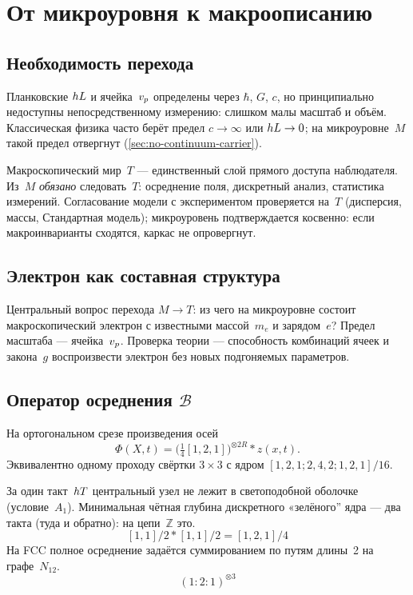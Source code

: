 \chapter{От микроуровня к макроописанию}
\label{ch:macro}

\section{Необходимость перехода}

Планковские $hL$ и ячейка~$v_p$ определены через $\hbar$, $G$, $c$,
но принципиально недоступны непосредственному измерению: слишком малы масштаб и объём.
Классическая физика часто берёт предел $c\to\infty$ или $hL\to 0$;
на микроуровне~$M$ такой предел отвергнут (\cref{sec:no-continuum-carrier}).

Макроскопический мир~$T$ --- единственный слой прямого доступа наблюдателя.
Из~$M$ \emph{обязано} следовать~$T$: осреднение поля, дискретный анализ, статистика измерений.
Согласование модели с экспериментом проверяется на~$T$ (дисперсия, массы, Стандартная модель);
микроуровень подтверждается косвенно: если макроинварианты сходятся,
каркас не опровергнут.

\section{Электрон как составная структура}

Центральный вопрос перехода $M\to T$: из чего на микроуровне состоит
макроскопический электрон с известными массой~$m_e$ и зарядом~$e$?
Предел масштаба --- ячейка~$v_p$.
Проверка теории --- способность комбинаций ячеек и закона~$g$
воспроизвести электрон без новых подгоняемых параметров.

\section{Оператор осреднения \texorpdfstring{$\mathcal{B}$}{B}}
\label{sec:readout}

\begin{definition}
\label{def:soft-readout}
На ортогональном срезе произведения осей
\[
  \Phi(X,t)=\bigl(\tfrac14[1,2,1]\bigr)^{\otimes 2R} * z(x,t).
\]
Эквивалентно одному проходу свёртки $3\times 3$ с ядром $[1,2,1;2,4,2;1,2,1]/16$.
\end{definition}

За один такт~$hT$ центральный узел не лежит в светоподобной оболочке (условие~$A_1$).
Минимальная чётная глубина дискретного «зелёного'' ядра --- два такта (туда и обратно):
на цепи~$\mathbb{Z}$ это.
\[
[1,1]/2*[1,1]/2=[1,2,1]/4
\]
На FCC полное осреднение задаётся суммированием по путям длины~2 на графе~$N_{12}$.
\[
(1{:}2{:}1)^{\otimes 3}
\]

